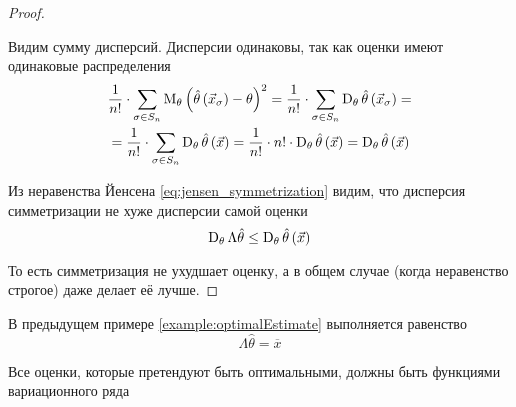\begin{proof}
\begin{enumerate}
      Видим сумму дисперсий.
      Дисперсии одинаковы, так как оценки имеют одинаковые распределения
      \begin{align*}
        &\frac{1}{n!}\cdot \sum_{\sigma\in S_n}
          \operatorname{M}_{\theta} 
            \left(\hat{\theta}\left(\vec{x}_\sigma\right)
            -\theta\right)^2
        = \frac{1}{n!}\cdot \sum_{\sigma\in S_n}
          \operatorname{D}_{\theta} 
            \hat{\theta}\left(\vec{x}_\sigma\right)= \\
        &= \frac{1}{n!}\cdot \sum_{\sigma\in S_n}
          \operatorname{D}_{\theta} \hat{\theta}\left(\vec{x}\right)
        = \frac{1}{n!}\cdot n!
          \cdot \operatorname{D}_{\theta} \hat{\theta}\left(\vec{x}\right)
        = \operatorname{D}_{\theta} \hat{\theta}\left(\vec{x}\right)
      \end{align*}

      Из неравенства Йенсена \eqref{eq:jensen_symmetrization} видим,
      что дисперсия симметризации не хуже дисперсии самой оценки
      \begin{equation*}
        \operatorname{D}_{\theta} \Lambda\hat{\theta}
          \le \operatorname{D}_{\theta} \hat{\theta}\left({\vec{x}}\right)
      \end{equation*}

  \end{enumerate}

  То есть симметризация не ухудшает оценку,
  а в общем случае (когда неравенство строгое) даже делает её лучше.
\end{proof}

\begin{comment}
\begin{definition}[Функция вариационного ряда]\index{функция!вариационного ряда}
  Если оценка $\hat{\theta}$ симметрична относительно перестановок аргументов,
  то она является функцией вариационного ряда
\end{definition}
\end{comment}

\begin{remark}
  В предыдущем примере \ref{example:optimalEstimate} выполняется равенство
  \begin{equation*}
    \Lambda \hat{\theta} = \overline{x}
  \end{equation*}
\end{remark}

\begin{remark}
  Все оценки, которые претендуют быть оптимальными,
  должны быть функциями вариационного ряда
\end{remark}


